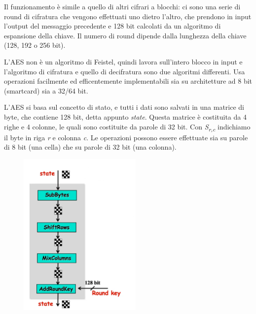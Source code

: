 Il funzionamento è simile a quello di altri cifrari a blocchi: ci sono una serie di round di cifratura che vengono effettuati uno dietro l'altro, che prendono in input l'output del messaggio precedente e 128 bit calcolati da un algoritmo di espansione della chiave. Il numero di round dipende dalla lunghezza della chiave (128, 192 o 256 bit).

L'AES non è un algoritmo di Feistel, quindi lavora sull'intero blocco in input e l'algoritmo di cifratura e quello di decifratura sono due algoritmi differenti. Usa operazioni facilmente ed efficentemente implementabili sia su architetture ad 8 bit (smartcard) sia a 32/64 bit. 

L'AES si basa sul concetto di stato, e tutti i dati sono salvati in una matrice di byte, che contiene 128 bit, detta appunto \textit{state}. Questa matrice è costituita da 4 righe e 4 colonne, le quali sono costituite da parole di 32 bit. Con \textit{S\textsubscript{r,c}} indichiamo il byte in riga \textit{r} e colonna \textit{c}. Le operazioni possono essere effettuate sia su parole di 8 bit (una cella) che su parole di 32 bit (una colonna). 

\begin{figure}[htb!]
    \centering
    \includegraphics[width=6cm]{./Images/cap1/1.18.png}
\end{figure} 

